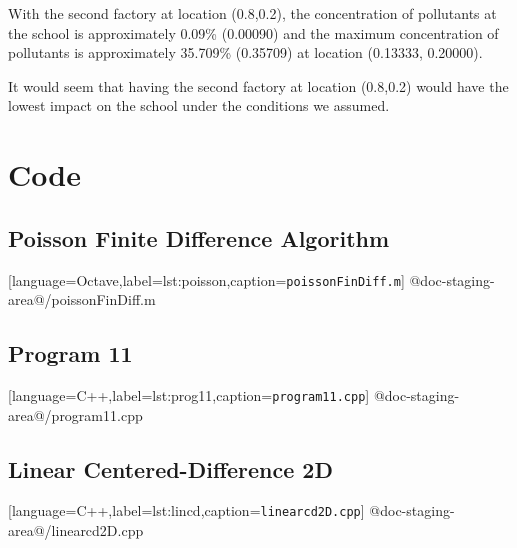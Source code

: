 \documentclass[12pt]{article}
\begin{document}
With the second factory at location (0.8,0.2), the concentration of
pollutants at the school is approximately 0.09\% (0.00090) and the maximum
concentration of pollutants is approximately 35.709\% (0.35709) at
location (0.13333, 0.20000).

It would seem that having the second factory at location (0.8,0.2)
would have the lowest impact on the school under the conditions we assumed.
\pagebreak
\section{Code}
\subsection{Poisson Finite Difference Algorithm}

[language=Octave,label=lst:poisson,caption=\texttt{poissonFinDiff.m}]
{@doc-staging-area@/poissonFinDiff.m}
\pagebreak
\subsection{Program 11}

[language=C++,label=lst:prog11,caption=\texttt{program11.cpp}]
{@doc-staging-area@/program11.cpp}
\pagebreak
\subsection{Linear Centered-Difference 2D}

[language=C++,label=lst:lincd,caption=\texttt{linearcd2D.cpp}]
{@doc-staging-area@/linearcd2D.cpp}
\end{document}

